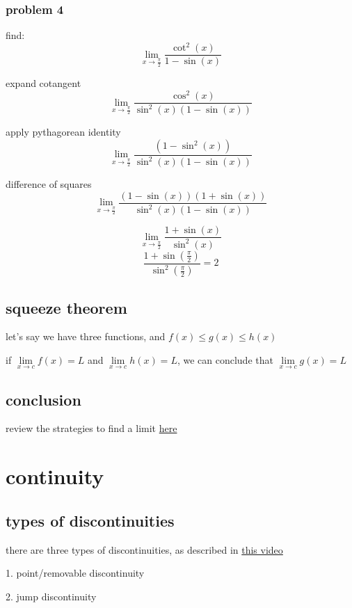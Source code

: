 \documentclass[11pt,a4paper]{article}
\begin{document}
\subsubsection{problem 4}
find:
$$\lim \limits_{x \to \frac{\pi}{2}} \frac{\cot^2(x)}{1-\sin(x)}$$

expand cotangent
$$\lim \limits_{x \to \frac{\pi}{2}} \frac{\cos^2(x)}{\sin^2(x)(1-\sin(x))}$$

apply pythagorean identity
$$\lim \limits_{x \to \frac{\pi}{2}} \frac{(1-\sin^2(x))}{\sin^2(x)(1-\sin(x))}$$

difference of squares
$$\lim \limits_{x \to \frac{\pi}{2}} \frac{(1-\sin(x))(1+\sin(x))}{\sin^2(x)(1-\sin(x))}$$

$$\lim \limits_{x \to \frac{\pi}{2}} \frac{1+\sin(x)}{\sin^2(x)}$$
$$\frac{1+\sin(\frac{\pi}{2})}{\sin^2(\frac{\pi}{2})} = 2$$

\subsection{squeeze theorem}
let's say we have three functions, and $f(x) \leq g(x) \leq h(x)$

if $\lim \limits_{x \to c} f(x) = L$ and $\lim \limits_{x \to c} h(x) = L$, we can conclude that $\lim \limits_{x \to c} g(x) = L$




\subsection{conclusion}

review the strategies to find a limit \href{https://www.khanacademy.org/math/ap-calculus-ab/ab-limits-new/ab-1-7/a/limit-strategies-flow-chart}{here}


\section{continuity}

\subsection{types of discontinuities}

there are three types of discontinuities, as described in \href{https://www.khanacademy.org/math/ap-calculus-ab/ab-limits-new/ab-1-10/v/types-of-discontinuities}{this video}

1. point/removable discontinuity

2. jump discontinuity
\end{document}
